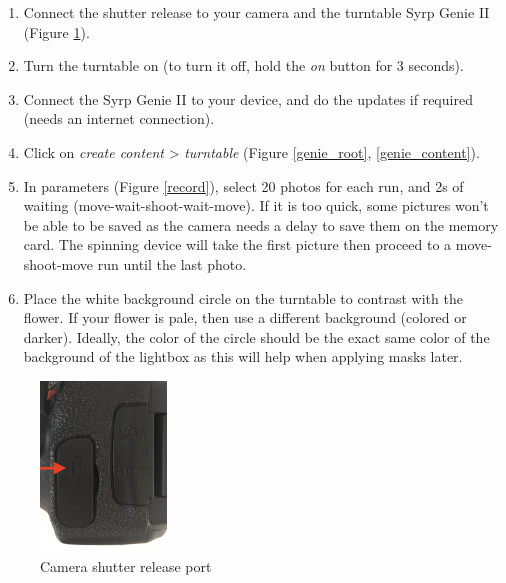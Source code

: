 \documentclass[10pt,letter,english]{article}
\begin{document}
\begin{enumerate}
    \item Connect the shutter release to your camera and the turntable Syrp Genie II (Figure \ref{fig:shutter}).
    \item Turn the turntable on (to turn it off, hold the \textit{on} button for 3 seconds).
    \item Connect the Syrp Genie II to your device, and do the updates if required (needs an internet connection).
    \item Click on \textit{create content} > \textit{turntable} (Figure \ref{genie_root}, \ref{genie_content}).
    \item In parameters (Figure \ref{record}), select 20 photos for each run, and 2s of waiting (move-wait-shoot-wait-move). If it is too quick, some pictures won't be able to be saved as the camera needs a delay to save them on the memory card. The spinning device will take the first picture then proceed to a move-shoot-move run until the last photo.%
    \item Place the white background circle on the turntable to contrast with the flower. If your flower is pale, then use a different background (colored or darker). Ideally, the color of the circle should be the exact same color of the background of the lightbox as this will help when applying masks later.
\end{enumerate}


\begin{figure}[H]
    \centering
    \includegraphics[width=0.3\textwidth]{Figures/shutter.jpg}
    \caption{Camera shutter release port}
    \label{fig:shutter}
\end{figure}
\end{document}
